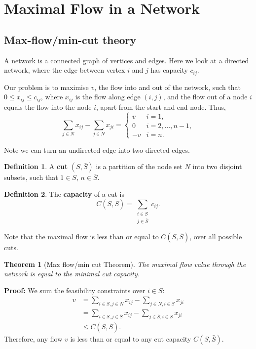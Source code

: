\documentclass[12pt]{article}
\newtheorem{theorem}{Theorem}[section]
\theoremstyle{definition}
\newtheorem{definition}{Definition}[section]
\theoremstyle{remark}
\begin{document}
\newpage

\section{Maximal Flow in a Network}%
\label{sec:maximal_flow_in_a_network}

\subsection{Max-flow/min-cut theory}%
\label{sub:max_flow_min_cut_theory}

A network is a connected graph of vertices and edges. Here we look at a directed network, where the edge between vertex $i$ and $j$ has capacity $c_{ij}$.

Our problem is to maximise $v$, the flow into and out of the network, such that $0 \leq x_{ij} \leq c_{ij}$, where $x_{ij}$ is the flow along edge $(i, j)$, and the flow out of a node $i$ equals the flow into the node $i$, apart from the start and end node. Thus,
\[
\sum_{j \in N}x_{ij} - \sum_{j \in N}x_{ji} =
\begin{cases}
	v & i = 1, \\
	0 & i = 2, \ldots, n-1, \\
	-v & i = n.
\end{cases}
\]

Note we can turn an undirected edge into two directed edges.

\begin{definition}
	A \textbf{cut} $(S, \bar S)$ is a partition of the node set $N$ into two disjoint subsets, such that $1 \in S$, $n \in \bar S$.
\end{definition}

\begin{definition}
	The \textbf{capacity} of a cut is
	\[
		C(S, \bar S) = \sum_{\substack{i \in S \\ j \in \bar S}}c_{ij}
	.\]
\end{definition}

Note that the maximal flow is less than or equal to $C(S, \bar S)$, over all possible cuts.

\begin{theorem}[Max flow/min cut Theorem]
	The maximal flow value through the network is equal to the minimal cut capacity.
\end{theorem}

\begin{adjustbox}{minipage = \columnwidth - 25.5pt, margin=1em, frame=1pt, margin=0em}
\textbf{Proof:} We sum the feasibility constraints over $i \in S$:
\begin{align*}
	v &= \sum_{i \in S, j \in N}x_{ij} - \sum_{j \in N, i \in S}x_{ji} \\
	  &= \sum_{i \in S, j \in \bar S}x_{ij} - \sum_{j \in \bar S, i \in S}x_{ji} \\
	  &\leq C(S, \bar S).
\end{align*}
Therefore, any flow $v$ is less than or equal to any cut capacity $C(S, \bar S)$.
\end{adjustbox}
\end{document}
